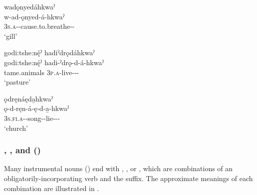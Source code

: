 
\ex wadǫnyedáhkwaˀ\\
\gll w-ad-ǫnyed-á-hkwaˀ\\
 \textsc{3s.a}-{\semireflexive}-cause.to.breathe-{\joinerA}-{\instrumental}\\
\glt `gill'

\ex godi:tshe:nę́ˀ hadiˀdrǫdáhkwaˀ  \\
\gll godi:tshe:nę́ˀ hadi-ˀdrǫ-d-á-hkwaˀ\\
tame.animals \textsc{3p.a}-live-{\euphonicd}--{\instrumental}\\
\glt ‘pasture’


\ex ǫdręnáęda̱hkwaˀ\\
\gll ǫ-d-ręn-á-ę-d-a̱-hkwaˀ\\
 \textsc{3s.fi.a}-{\semireflexive}-song-{\joinerA}-lie-{\euphonicd}--{\instrumental}\\
\glt `church'
\z
\z


\subsubsection*{, , and  ()} \label{[+ędahkwaˀ], [+odahkwaˀ], and [+ǫdahkwaˀ]}
Many instrumental nouns () end with , , or , which are combinations of an obligatorily-incorporating verb and the  \textsc{\instrumental} suffix. The approximate meanings of each combination are illustrated in .

